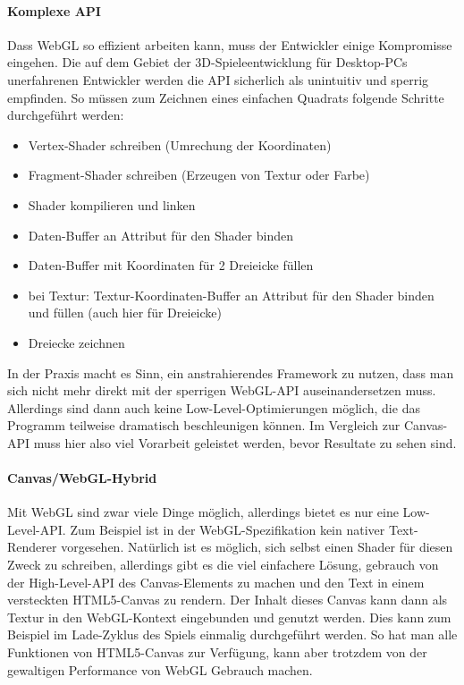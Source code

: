 \documentclass[a4paper, 12pt]{article}
\begin{document}
\paragraph{Komplexe API} Dass WebGL so effizient arbeiten kann, muss der Entwickler einige Kompromisse eingehen. Die auf dem Gebiet der 3D-Spieleentwicklung für Desktop-PCs unerfahrenen Entwickler werden die API sicherlich als unintuitiv und sperrig empfinden. So müssen zum Zeichnen eines einfachen Quadrats folgende Schritte durchgeführt werden:
\begin{itemize}
	\item Vertex-Shader schreiben (Umrechung der Koordinaten)
	\item Fragment-Shader schreiben (Erzeugen von Textur oder Farbe)
	\item Shader kompilieren und linken
	\item Daten-Buffer an Attribut für den Shader binden
	\item Daten-Buffer mit Koordinaten für 2 Dreieicke füllen
	\item bei Textur: Textur-Koordinaten-Buffer an Attribut für den Shader binden und füllen (auch hier für Dreieicke)
	\item Dreiecke zeichnen
\end{itemize}
In der Praxis macht es Sinn, ein anstrahierendes Framework zu nutzen, dass man sich nicht mehr direkt mit der sperrigen WebGL-API auseinandersetzen muss. Allerdings sind dann auch keine Low-Level-Optimierungen möglich, die das Programm teilweise dramatisch beschleunigen können.
Im Vergleich zur Canvas-API muss hier also viel Vorarbeit geleistet werden, bevor Resultate zu sehen sind.
\paragraph{Canvas/WebGL-Hybrid} Mit WebGL sind zwar viele Dinge möglich, allerdings bietet es nur eine Low-Level-API. Zum Beispiel ist in der WebGL-Spezifikation kein nativer Text-Renderer vorgesehen. Natürlich ist es möglich, sich selbst einen Shader für diesen Zweck zu schreiben, allerdings gibt es die viel einfachere Lösung, gebrauch von der High-Level-API des Canvas-Elements zu machen und den Text in einem versteckten HTML5-Canvas zu rendern. Der Inhalt dieses Canvas kann dann als Textur in den WebGL-Kontext eingebunden und genutzt werden. Dies kann zum Beispiel im Lade-Zyklus des Spiels einmalig durchgeführt werden. So hat man alle Funktionen von HTML5-Canvas zur Verfügung, kann aber trotzdem von der gewaltigen Performance von WebGL Gebrauch machen.
\end{document}
